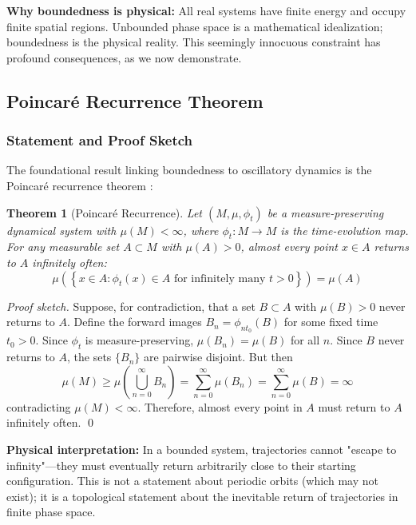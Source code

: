 \documentclass[twocolumn,10pt]{article}
\newtheorem{theorem}{Theorem}[section]
\theoremstyle{remark}
\begin{document}
\textbf{Why boundedness is physical:} All real systems have finite energy and occupy finite spatial regions. Unbounded phase space is a mathematical idealization; boundedness is the physical reality. This seemingly innocuous constraint has profound consequences, as we now demonstrate.

\subsection{Poincaré Recurrence Theorem}

\subsubsection{Statement and Proof Sketch}

The foundational result linking boundedness to oscillatory dynamics is the Poincaré recurrence theorem \cite{poincare1890}:

\begin{theorem}[Poincaré Recurrence]
\label{thm:poincare_recurrence}
Let $(M, \mu, \phi_t)$ be a measure-preserving dynamical system with $\mu(M) < \infty$, where $\phi_t : M \to M$ is the time-evolution map. For any measurable set $A \subset M$ with $\mu(A) > 0$, almost every point $x \in A$ returns to $A$ infinitely often:
\begin{equation}
    \mu\left(\left\{x \in A : \phi_t(x) \in A \text{ for infinitely many } t > 0\right\}\right) = \mu(A)
\end{equation}
\end{theorem}

\begin{proof}[Proof sketch]
Suppose, for contradiction, that a set $B \subset A$ with $\mu(B) > 0$ never returns to $A$. Define the forward images $B_n = \phi_{nt_0}(B)$ for some fixed time $t_0 > 0$. Since $\phi_t$ is measure-preserving, $\mu(B_n) = \mu(B)$ for all $n$. Since $B$ never returns to $A$, the sets $\{B_n\}$ are pairwise disjoint. But then
\begin{equation}
    \mu(M) \geq \mu\left(\bigcup_{n=0}^{\infty} B_n\right) = \sum_{n=0}^{\infty} \mu(B_n) = \sum_{n=0}^{\infty} \mu(B) = \infty
\end{equation}
contradicting $\mu(M) < \infty$. Therefore, almost every point in $A$ must return to $A$ infinitely often. \qed
\end{proof}

\textbf{Physical interpretation:} In a bounded system, trajectories cannot "escape to infinity"—they must eventually return arbitrarily close to their starting configuration. This is not a statement about periodic orbits (which may not exist); it is a topological statement about the inevitable return of trajectories in finite phase space.
\end{document}
